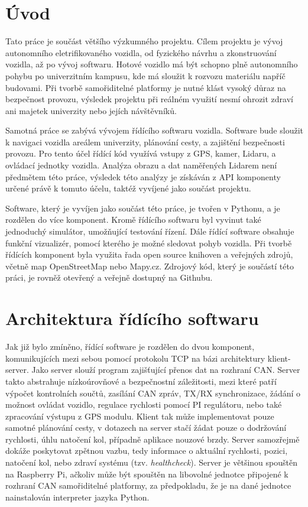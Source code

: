 \documentclass[czech,bachelor,dept460,male,cpp,cpdeclaration]{diploma}
\begin{document}
\MakeTitlePages

\section{Úvod}
\label{sec:Introduction}
Tato práce je součást většího výzkumného projektu. Cílem projektu je vývoj autonomního eletrifikovaného vozidla, 
od fyzického návrhu a zkonstruování vozidla, až po vývoj softwaru. Hotové vozidlo má být schopno plně autonomního pohybu
po univerzitním kampusu, kde má sloužit k rozvozu materiálu napříč budovami. Při tvorbě samořiditelné platformy je nutné
klást vysoký důraz na bezpečnost provozu, výsledek projektu při reálném využití nesmí ohrozit zdraví ani majetek 
univerzity nebo jejích návštěvníků. 

Samotná práce se zabývá vývojem řídícího softwaru vozidla. Software bude sloužit k navigaci vozidla areálem univerzity, 
plánování cesty, a zajištění bezpečnosti provozu. Pro tento účel řídící kód využívá vstupy z GPS, kamer, Lidaru, 
a ovládací jednotky vozidla. Analýza obrazu a dat naměřených Lidarem není předmětem této práce, výsledek této analýzy 
je získáván z API komponenty určené právě k tomuto účelu, taktéž vyvíjené jako součást projektu.

Software, který je vyvíjen jako součást této práce, je tvořen v Pythonu, a je rozdělen do více komponent. Kromě řídícího
softwaru byl vyvinut také jednoduchý simulátor, umožňující testování řízení. Dále řídící software obsahuje funkční 
vizualizér, pomocí kterého je možné sledovat pohyb vozidla. Při tvorbě řídících komponent byla využita řada open source
knihoven a veřejných zdrojů, včetně map OpenStreetMap nebo Mapy.cz. Zdrojový kód, který je součástí této práci, je 
rovněž otevřený a veřejně dostupný na Githubu.

\section{Architektura řídícího softwaru}
Jak již bylo zmíněno, řídící software je rozdělen do dvou komponent, komunikujících mezi sebou pomocí protokolu TCP na bázi 
architektury klient-server. Jako server slouží program zajišťující přenos dat na rozhraní CAN. Server takto abstrahuje 
nízkoúrovňové a bezpečnostní záležitosti, mezi které patří výpočet kontrolních součtů, zasílání CAN zpráv, TX/RX synchronizace, 
žádání o možnost ovládat vozidlo, regulace rychlosti pomocí PI regulátoru, nebo také zpracování výstupu z GPS modulu. Klient tak
může implementovat pouze samotné plánování cesty, v dotazech na server stačí žádat pouze o dodržování rychlosti, úhlu natočení 
kol, případně aplikace nouzové brzdy. Server samozřejmě dokáže poskytovat zpětnou vazbu, tedy informace o aktuální rychlosti,
pozici, natočení kol, nebo zdraví systému (tzv. \emph{healthcheck}). Server je většinou spouštěn na Raspberry Pi, ačkoliv může
být spouštěn na libovolné jednotce připojené k rozhraní CAN samořiditelné platformy, za předpokladu, že je na dané jednotce
nainstalován interpreter jazyka Python.
\end{document}

